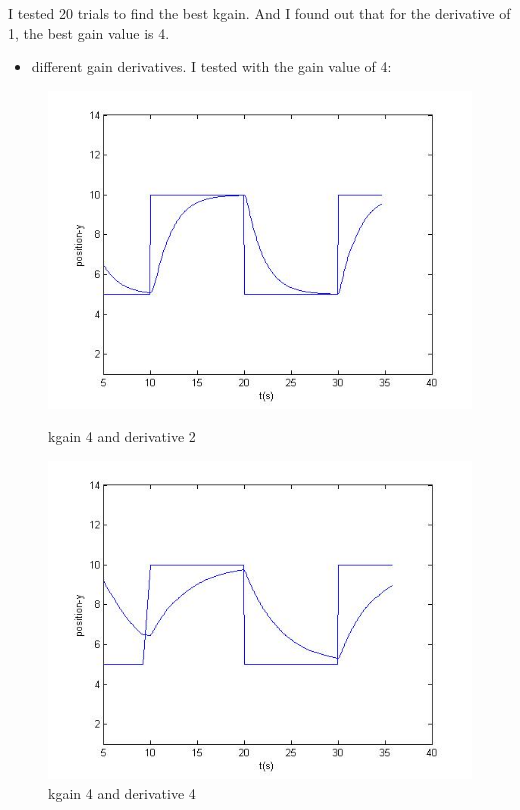 I tested 20 trials to find the best kgain. And I found out that for the derivative of 1, the best gain value is 4.

\begin{itemize}
\item different gain derivatives. I tested with the gain value of 4:
\end{itemize}

\begin{figure}[!htb]
\captionsetup{justification=centering}
  \includegraphics[width=\linewidth]{fig/gain4d2.jpg}
  \caption{kgain 4 and derivative 2}
\endminipage\hfill
{}
  \includegraphics[width=\linewidth]{fig/gain4d4.jpg}
  \caption{kgain 4 and derivative 4}

\end{figure}

